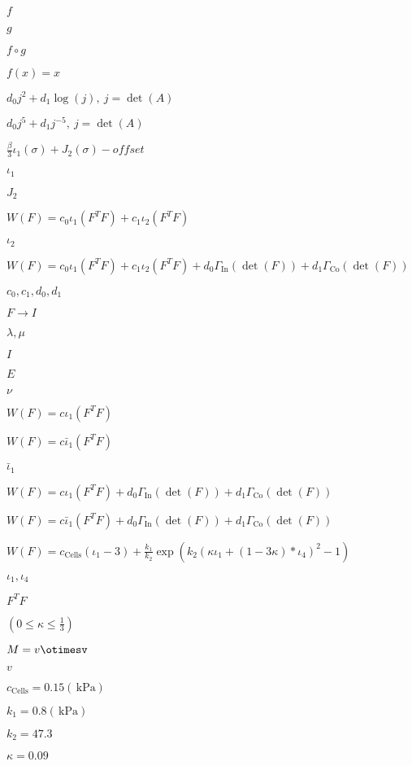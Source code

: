 \documentclass{article}
\begin{document}
$f$
\pagebreak

$g$
\pagebreak

$ f \circ g $
\pagebreak

$ f(x)=x $
\pagebreak

$ d_0 j^2 + d_1 \log(j),\ j=\det(A) $
\pagebreak

$ d_0 j^5 + d_1 j^{-5},\ j=\det(A) $
\pagebreak

$ \frac{\beta}{3}\iota_1(\sigma) + J_2(\sigma)-offset $
\pagebreak

$\iota_1$
\pagebreak

$J_2$
\pagebreak

$ W(F)=c_0\iota_1(F^T F) + c_1\iota_2(F^T F) $
\pagebreak

$\iota_2$
\pagebreak

$ W(F)=c_0\iota_1(F^T F) + c_1\iota_2(F^T F) + d_0\Gamma_\mathrm{In}(\det(F))+d_1\Gamma_\mathrm{Co}(\det(F)) $
\pagebreak

$c_0,c_1,d_0,d_1$
\pagebreak

$F\rightarrow I$
\pagebreak

$\lambda,\mu$
\pagebreak

$I$
\pagebreak

$E$
\pagebreak

$\nu$
\pagebreak

$ W(F)=c\iota_1(F^T F) $
\pagebreak

$ W(F)=c\bar\iota_1(F^T F) $
\pagebreak

$\bar\iota_1$
\pagebreak

$ W(F)=c\iota_1(F^T F)+d_0\Gamma_\mathrm{In}(\det(F))+d_1\Gamma_\mathrm{Co}(\det(F)) $
\pagebreak

$ W(F)=c\bar\iota_1(F^T F)+d_0\Gamma_\mathrm{In}(\det(F))+d_1\Gamma_\mathrm{Co}(\det(F)) $
\pagebreak

$ W(F)= c_\mathrm{Cells}(\iota_1-3) + \frac{k_1}{k_2}\exp(k_2(\kappa\iota_1+(1-3\kappa)*\iota_4)^2-1) $
\pagebreak

$ \iota_1,\iota_4 $
\pagebreak

$F^T F$
\pagebreak

$(0\le\kappa\le\frac{1}{3})$
\pagebreak

$M=v\otimesv$
\pagebreak

$v$
\pagebreak

$c_\mathrm{Cells}=0.15 (\,\mathrm{kPa})$
\pagebreak

$k_1=0.8 (\,\mathrm{kPa})$
\pagebreak

$k_2=47.3$
\pagebreak

$\kappa=0.09$
\pagebreak
\end{document}

